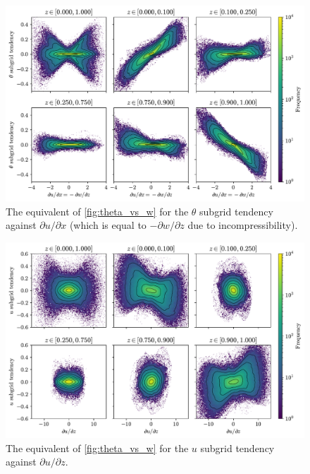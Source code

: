 \documentclass[../main.tex]{subfiles}
\begin{document}
\begin{figure}[ht]
    \centering
    \includegraphics[width=0.9\linewidth]{figures/theta_vs_dudx.pdf}
    \caption{
        The equivalent of \cref{fig:theta_vs_w} for the $\theta$ subgrid
        tendency against $\partial u/\partial x$ (which is equal to
        $-\partial w/\partial z$ due to incompressibility).
    }
    \label{fig:theta_vs_dudx}
\end{figure}

\begin{figure}[ht]
    \centering
    \includegraphics[width=0.9\linewidth]{figures/u_vs_dudz.pdf}
    \caption{
        The equivalent of \cref{fig:theta_vs_w} for the $u$ subgrid
        tendency against $\partial u/\partial z$.
    }
    \label{fig:u_vs_dudz}
\end{figure}
\end{document}
